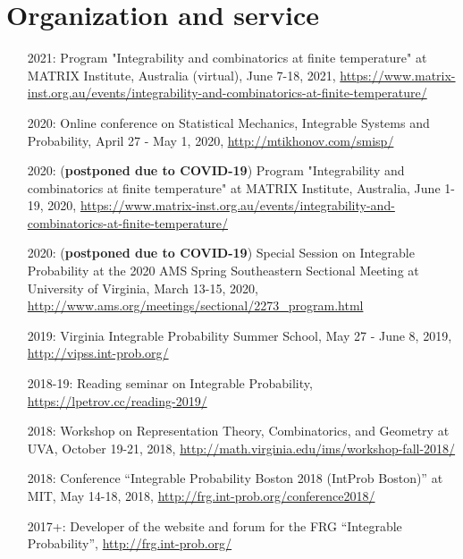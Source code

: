 \documentclass[letterpaper,11pt]{article}
\begin{document}
\section*{Organization and service}

\begin{itemize}
	\item [2021:]
		Program "Integrability and combinatorics at finite temperature"
		at MATRIX Institute, Australia
		(virtual),
		June 7-18, 2021,
		\url{https://www.matrix-inst.org.au/events/integrability-and-combinatorics-at-finite-temperature/}
	\item [2020:]
	Online conference on Statistical Mechanics, Integrable Systems and Probability,
	April 27 - May 1, 2020,
	\url{http://mtikhonov.com/smisp/}
	\item [2020:]
	(\textbf{postponed due to COVID-19})
	Program "Integrability and combinatorics at finite temperature"
	at MATRIX Institute,
	Australia,
	June 1-19, 2020,
	\url{https://www.matrix-inst.org.au/events/integrability-and-combinatorics-at-finite-temperature/}
	\item [2020:]
	(\textbf{postponed due to COVID-19})
		Special Session on Integrable Probability
		at the 2020 AMS Spring Southeastern Sectional Meeting at 
		University of Virginia,
		March 13-15, 2020,
		\url{http://www.ams.org/meetings/sectional/2273_program.html}
	\item [2019:]
		Virginia Integrable Probability Summer School,
		May 27 - June 8, 2019,
		\url{http://vipss.int-prob.org/}

	\item[2018-19:]
		Reading seminar on Integrable Probability,
	      \url{https://lpetrov.cc/reading-2019/}
		

	\item [2018:]
		Workshop on Representation Theory, Combinatorics, and Geometry
		at UVA,
		October 19-21, 2018,
		\url{http://math.virginia.edu/ims/workshop-fall-2018/}

	\item [2018:]
		Conference 
		``Integrable Probability Boston 2018 (IntProb Boston)''
		at MIT,
		May 14-18, 2018,
		\url{http://frg.int-prob.org/conference2018/}

	\item [2017+:]
		Developer of the website and forum for the FRG ``Integrable Probability'',
		\url{http://frg.int-prob.org/}


\end{itemize}
\end{document}
